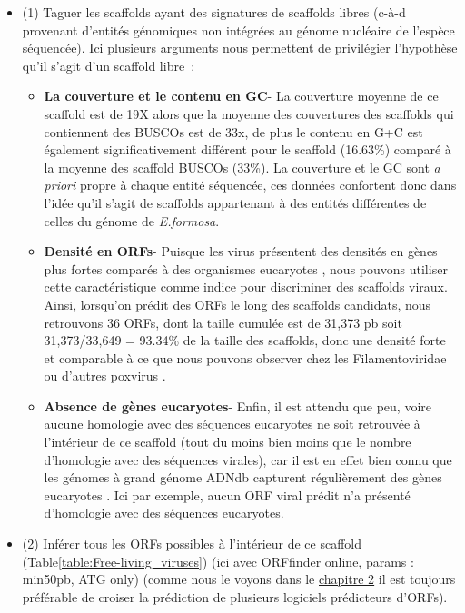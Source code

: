 \begin{itemize}

    \item (1) Taguer les scaffolds ayant des signatures de scaffolds libres (c-à-d provenant d'entités génomiques non intégrées au génome nucléaire de l'espèce séquencée). Ici plusieurs arguments nous permettent de privilégier l'hypothèse qu'il s'agit d'un scaffold libre : 
    
    \begin{itemize}
       \item  \textbf{La couverture et le contenu en GC}- La couverture moyenne de ce scaffold est de 19X alors que la moyenne des couvertures des scaffolds qui contiennent des BUSCOs est de 33x, de plus le contenu en G+C est également significativement différent pour le scaffold (16.63\%) comparé à la moyenne des scaffold BUSCOs (33\%). La couverture et le GC sont \textit{a priori} propre à chaque entité séquencée, ces données confortent donc dans l'idée qu'il s'agit de scaffolds appartenant à des entités différentes de celles du génome de \textit{E.formosa}. 
       
       \item \textbf{Densité en ORFs}- Puisque les virus présentent des densités en gènes plus fortes comparés à des organismes eucaryotes \citep{mahmoudabadi_comprehensive_2018}, nous pouvons utiliser cette caractéristique comme indice pour discriminer des scaffolds viraux. Ainsi, lorsqu'on prédit des ORFs le long des scaffolds candidats, nous retrouvons 36 ORFs, dont la taille cumulée est de 31,373 pb soit 31,373/33,649 = 93.34\% de la taille des scaffolds, donc une densité forte et comparable à ce que nous pouvons observer chez les Filamentoviridae ou d'autres poxvirus \citep{zhao_genome_2011}. 
       
       \item \textbf{Absence de gènes eucaryotes}- Enfin, il est attendu que peu, voire aucune homologie avec des séquences eucaryotes ne soit retrouvée à l'intérieur de ce scaffold (tout du moins bien moins que le nombre d'homologie avec des séquences virales), car il est en effet bien connu que les génomes à grand génome ADNdb capturent régulièrement des gènes eucaryotes \citep{irwin_systematic_2022}. Ici par exemple, aucun ORF viral prédit n'a présenté d'homologie avec des séquences eucaryotes.  
       
       \end{itemize}
 
    \item (2) Inférer tous les ORFs possibles à l'intérieur de ce scaffold (Table\ref{table:Free-living_viruses}) (ici avec ORFfinder online, params : min50pb, ATG only) (comme nous le voyons dans le \hyperref[sec:chap2]{chapitre 2} il est toujours préférable de croiser la prédiction de plusieurs logiciels prédicteurs d'ORFs).


\end{itemize}
